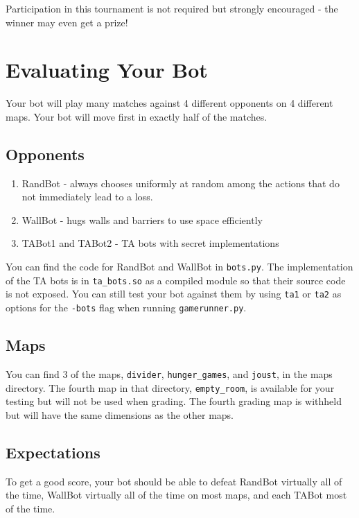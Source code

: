 \documentclass{article}
\begin{document}
Participation in this tournament is not required but strongly encouraged - the winner may even get a prize!

\section{Evaluating Your Bot}
Your bot will play many matches against 4 different opponents on 4 different maps.
Your bot will move first in exactly half of the matches.

\subsection{Opponents}
\begin{enumerate}
    \item RandBot - always chooses uniformly at random among the actions that do not immediately lead to a loss.

    \item WallBot - hugs walls and barriers to use space efficiently

    \item TABot1 and TABot2 - TA bots with secret implementations
\end{enumerate}
You can find the code for RandBot and WallBot in \verb|bots.py|. The implementation of the TA bots is in \verb|ta_bots.so| as a compiled module so that their source code is not exposed. You can still test your bot against them by using \texttt{ta1} or \texttt{ta2} as options for the \texttt{-bots} flag when running \texttt{gamerunner.py}.

\subsection{Maps}
You can find 3 of the maps, \verb|divider|, \verb|hunger_games|, and \verb|joust|, in the maps directory.
The fourth map in that directory, \verb|empty_room|, is available for your testing but will not be used when grading.
The fourth grading map is withheld but will have the same dimensions as the other maps.

\subsection{Expectations}
To get a good score, your bot should be able to defeat RandBot virtually all of the time, WallBot virtually all of the time on most maps, and each TABot most of the time.
\end{document}
